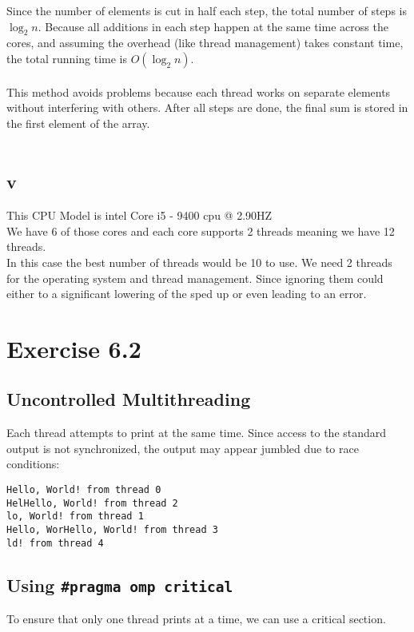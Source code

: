 \documentclass[a4paper]{article}
\begin{document}
Since the number of elements is cut in half each step, the total number of steps is \(\log_2 n\). Because all additions in each step happen at the same time across the cores, and assuming the overhead (like thread management) takes constant time, the total running time is \(O(\log_2 n)\).
\\ \\
This method avoids problems because each thread works on separate elements without interfering with others. After all steps are done, the final sum is stored in the first element of the array.\\ \\
\subsection*{v}
This CPU Model is intel Core i5 - 9400 cpu @ 2.90HZ\\
We have 6 of those cores and each core supports 2 threads meaning we have 12 threads.\\
In this case the best number of threads would be 10 to use. We need 2 threads for the operating system and thread management. Since ignoring them could either to a significant lowering of the sped up or even leading to an error. 

\section{Exercise 6.2}
\subsection*{Uncontrolled Multithreading}

Each thread attempts to print at the same time. Since access to the standard output is not synchronized, the output may appear jumbled due to race conditions:\\

\begin{verbatim}
Hello, World! from thread 0
HelHello, World! from thread 2
lo, World! from thread 1
Hello, WorHello, World! from thread 3
ld! from thread 4
\end{verbatim}

\subsection*{Using \texttt{\#pragma omp critical}}

To ensure that only one thread prints at a time, we can use a critical section.\\
\end{document}
